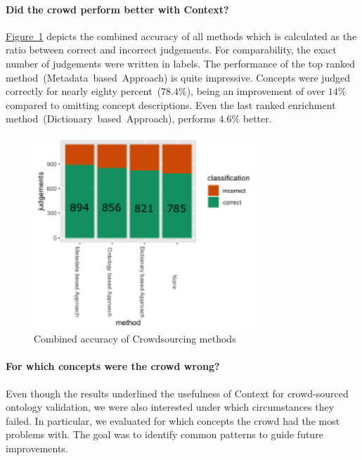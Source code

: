 \paragraph{Did the crowd perform better with Context?}
\hyperref[fig:results_accuracy_combined]{Figure~\ref*{fig:results_accuracy_combined}} depicts the combined accuracy of all methods which is calculated
as the ratio between correct and incorrect judgements. For comparability, the exact number of judgements were written in labels. The performance of the top ranked method~(Metadata~based~Approach) is quite impressive. Concepts were judged correctly for nearly eighty percent~($78.4\%$), being an improvement of over $14\%$ compared to omitting concept descriptions. Even the last ranked enrichment method~(Dictionary~based~Approach), performs $4.6\%$ better.
\begin{figure}
	 \centering
	 \includegraphics[width=0.75\textwidth]{plots/comparison/barplot_all_judgements_corrected}
	 \caption{Combined accuracy of Crowdsourcing methods}\label{fig:results_accuracy_combined}
\end{figure}

\paragraph{For which concepts were the crowd wrong?}
Even though the results underlined the usefulness of Context for crowd-sourced ontology validation, we were also interested under which circumstances they failed. In particular, we evaluated for which concepts the crowd had the most problems with. The goal was to identify common patterns to guide future improvements. 

